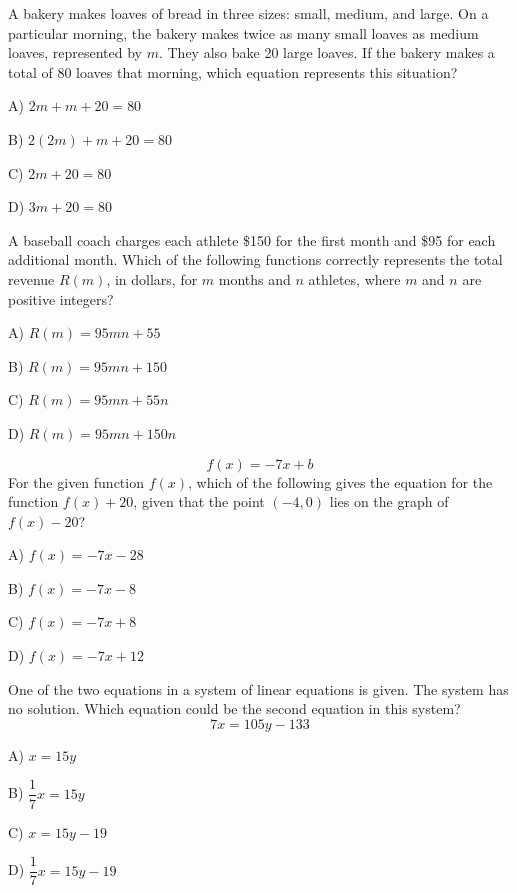 \vfill
\noindent\begin{minipage}{\linewidth}
\par\smallskip
A bakery makes loaves of bread in three sizes: small, medium, and large. On a particular morning, the bakery makes twice as many small loaves as medium loaves, represented by $m$. They also bake 20 large loaves. If the bakery makes a total of 80 loaves that morning, which equation represents this situation?
\begin{satchoices}
  \item[A)] $2m+m+20=80$
  \item[B)] $2(2m)+m+20=80$
  \item[C)] $2m+20=80$
  \item[D)] $3m+20=80$
\end{satchoices}
\end{minipage}
\vfill
\clearpage
\noindent\begin{minipage}{\linewidth}
\par\smallskip
A baseball coach charges each athlete \$150 for the first month and \$95 for each additional month. Which of the following functions correctly represents the total revenue $R(m)$, in dollars, for $m$ months and $n$ athletes, where $m$ and $n$ are positive integers?
\begin{satchoices}
  \item[A)] $R(m)=95mn+55$
  \item[B)] $R(m)=95mn+150$
  \item[C)] $R(m)=95mn+55n$
  \item[D)] $R(m)=95mn+150n$
\end{satchoices}
\end{minipage}
\vfill
\noindent\begin{minipage}{\linewidth}
\par\smallskip
$$f(x)=-7x+b$$ For the given function $f(x)$, which of the following gives the equation for the function $f(x)+20$, given that the point $(-4,0)$ lies on the graph of $f(x)-20$?
\begin{satchoices}
  \item[A)] $f(x)=-7x-28$
  \item[B)] $f(x)=-7x-8$
  \item[C)] $f(x)=-7x+8$
  \item[D)] $f(x)=-7x+12$
\end{satchoices}
\end{minipage}
\vfill
\noindent\begin{minipage}{\linewidth}
\par\smallskip
One of the two equations in a system of linear equations is given. The system has no solution. Which equation could be the second equation in this system? $$7x=105y-133$$
\begin{satchoices}
  \item[A)] $x=15y$
  \item[B)] $\dfrac{1}{7}x=15y$
  \item[C)] $x=15y-19$
  \item[D)] $\dfrac{1}{7}x=15y-19$
\end{satchoices}
\end{minipage}
